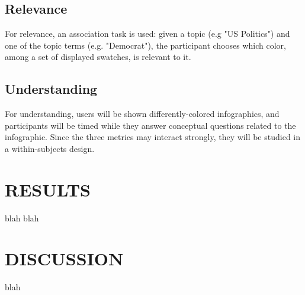 \documentclass{article}
\begin{document}
\subsection{Relevance}
For relevance, an association task is used: given a topic (e.g "US Politics") and one of the topic terms (e.g. "Democrat"), the participant chooses which color, among a set of displayed swatches, is relevant to it.

\subsection{Understanding}
For understanding, users will be shown differently-colored infographics, and participants will be timed while they answer conceptual questions related to the infographic. Since the three metrics may interact strongly, they will be studied in a within-subjects design.

\section{RESULTS}
blah blah

\section{DISCUSSION}
blah






\end{document}
